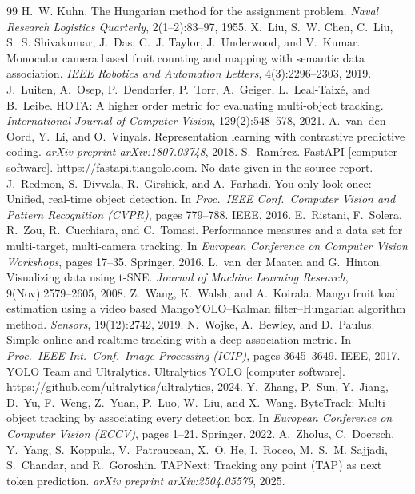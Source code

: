 \documentclass[11pt,a4paper]{article}
\begin{document}
\begin{thebibliography}{99}
 H.~W. Kuhn. The Hungarian method for the assignment problem. \emph{Naval Research Logistics Quarterly}, 2(1--2):83--97, 1955.
 X.~Liu, S.~W. Chen, C.~Liu, S.~S. Shivakumar, J.~Das, C.~J. Taylor, J.~Underwood, and V.~Kumar. Monocular camera based fruit counting and mapping with semantic data association. \emph{IEEE Robotics and Automation Letters}, 4(3):2296--2303, 2019.
 J.~Luiten, A.~Osep, P.~Dendorfer, P.~Torr, A.~Geiger, L.~Leal-Taix\'e, and B.~Leibe. HOTA: A higher order metric for evaluating multi-object tracking. \emph{International Journal of Computer Vision}, 129(2):548--578, 2021.
 A.~van~den Oord, Y.~Li, and O.~Vinyals. Representation learning with contrastive predictive coding. \emph{arXiv preprint arXiv:1807.03748}, 2018.
 S.~Ram\'irez. FastAPI [computer software]. \url{https://fastapi.tiangolo.com}. No date given in the source report.
 J.~Redmon, S.~Divvala, R.~Girshick, and A.~Farhadi. You only look once: Unified, real-time object detection. In \emph{Proc.\ IEEE Conf.\ Computer Vision and Pattern Recognition (CVPR)}, pages 779--788. IEEE, 2016.
 E.~Ristani, F.~Solera, R.~Zou, R.~Cucchiara, and C.~Tomasi. Performance measures and a data set for multi-target, multi-camera tracking. In \emph{European Conference on Computer Vision Workshops}, pages 17--35. Springer, 2016.
 L.~van~der Maaten and G.~Hinton. Visualizing data using t-SNE. \emph{Journal of Machine Learning Research}, 9(Nov):2579--2605, 2008.
 Z.~Wang, K.~Walsh, and A.~Koirala. Mango fruit load estimation using a video based MangoYOLO--Kalman filter--Hungarian algorithm method. \emph{Sensors}, 19(12):2742, 2019.
 N.~Wojke, A.~Bewley, and D.~Paulus. Simple online and realtime tracking with a deep association metric. In \emph{Proc.\ IEEE Int.\ Conf.\ Image Processing (ICIP)}, pages 3645--3649. IEEE, 2017.
 YOLO Team and Ultralytics. Ultralytics YOLO [computer software]. \url{https://github.com/ultralytics/ultralytics}, 2024.
 Y.~Zhang, P.~Sun, Y.~Jiang, D.~Yu, F.~Weng, Z.~Yuan, P.~Luo, W.~Liu, and X.~Wang. ByteTrack: Multi-object tracking by associating every detection box. In \emph{European Conference on Computer Vision (ECCV)}, pages 1--21. Springer, 2022.
 A.~Zholus, C.~Doersch, Y.~Yang, S.~Koppula, V.~Patraucean, X.~O. He, I.~Rocco, M.~S.~M. Sajjadi, S.~Chandar, and R.~Goroshin. TAPNext: Tracking any point (TAP) as next token prediction. \emph{arXiv preprint arXiv:2504.05579}, 2025.
\end{thebibliography}
\end{document}
